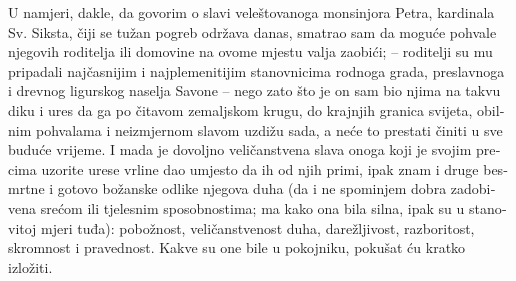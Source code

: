 \documentclass[a5paper,twoside]{article}
\begin{document}
\begin{pages}
\begin{Rightside}
\begin{croatian}
\pend
\pstart
U namjeri, dakle, da govorim o slavi veleštovanoga monsinjora Petra, kardinala Sv. Siksta, čiji se tužan pogreb održava danas, smatrao sam da moguće pohvale njegovih roditelja ili domovine na ovome mjestu valja zaobići;  – roditelji su mu  pripadali najčasnijim i najplemenitijim stanovnicima rodnoga grada, preslavnoga i drevnog ligurskog naselja Savone – nego zato što je on sam bio njima na takvu diku i ures da ga po čitavom zemaljskom krugu, do krajnjih granica svijeta, obilnim pohvalama i neizmjernom slavom uzdižu sada, a neće to prestati činiti u sve buduće vrijeme.  I mada je dovoljno veličanstvena slava onoga koji je svojim precima uzorite urese vrline dao umjesto da ih od njih primi, ipak znam i druge besmrtne i gotovo božanske odlike njegova duha (da i ne spominjem dobra zadobivena srećom ili tjelesnim sposobnostima; ma kako ona bila silna, ipak su u stanovitoj mjeri tuđa): pobožnost, veličanstvenost duha, darežljivost, razboritost, skromnost i pravednost.  Kakve su one bile u pokojniku, pokušat ću kratko izložiti.
\pend
\pstart

\end{croatian}
\end{Rightside}
\end{pages}
\end{document}
